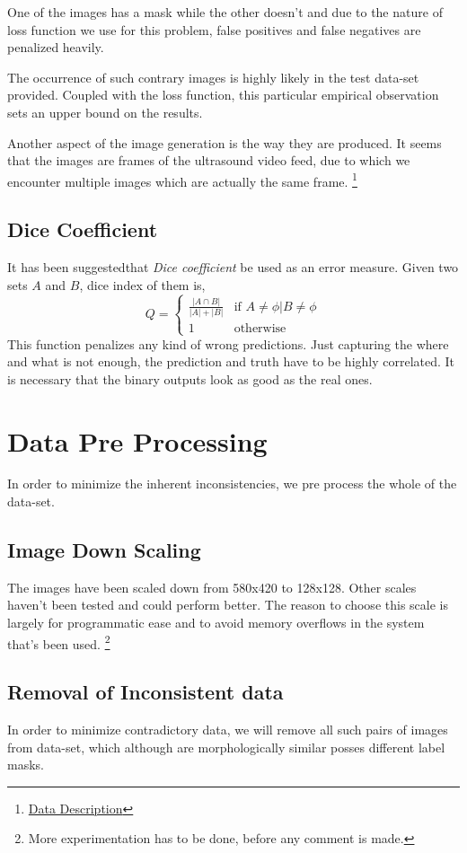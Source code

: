 \documentclass[12pt, a4paper]{article}
\begin{document}
One of the images has a mask while the other doesn't and due to the nature of loss function we use for this problem, false positives and false negatives are penalized heavily.

The occurrence of such contrary images is highly likely in the test data-set provided. Coupled with the loss function, this particular empirical observation sets an upper bound on the results.

Another aspect of the image generation is the way they are produced. It seems that the images are frames of the ultrasound video feed, due to which we encounter multiple images which are actually the same frame.
\footnote{\href{https://www.kaggle.com/c/ultrasound-nerve-segmentation/data}{Data Description}}
\subsection{Dice Coefficient}
It has been suggested\footnotemark that \emph{Dice coefficient} be used as an error measure. Given two sets $A$ and $B$, dice index of them is, 
$$
Q =
\left\{
	\begin{array}{ll}
		 	\frac{|A\cap B|}{|A| + |B|} & \mbox{if } A\neq\phi | B\neq\phi \\
			1 & \mbox{otherwise}
	\end{array}
\right.
$$
This function penalizes any kind of wrong predictions. Just capturing the where and what is not enough, the prediction and truth have to be highly correlated. It is necessary that the binary outputs look as good as the real ones.


\section{Data Pre Processing}
In order to minimize the inherent inconsistencies, we pre process the whole of the data-set. 

\subsection{Image Down Scaling}
The images have been scaled down from 580x420 to 128x128. Other scales haven't been tested and could perform better. The reason to choose this scale is largely for programmatic ease and to avoid memory overflows in the system that's been used. \footnote{More experimentation has to be done, before any comment is made.}
\subsection{Removal of Inconsistent data}
In order to minimize contradictory data, we will remove all such pairs of images from data-set, which although are morphologically  similar posses different label masks. 
\end{document}
